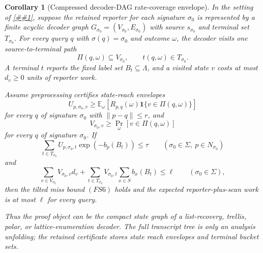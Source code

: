 \documentclass[10pt]{article}
\newcommand{\cref}[1]{\ref{##1}}
\newtheorem{corollary}[theorem]{Corollary}
\theoremstyle{definition}
\newcommand{\E}{\mathbb{E}}
\begin{document}
\begin{corollary}[Compressed decoder-DAG rate-coverage envelope]
   \label{cor:compressed-decoder-dag-rate-coverage}
   In the setting of \cref{lem:finite-signature-rate-coverage}, suppose the
   retained reporter for each signature \(\sigma_0\) is represented by a finite
   acyclic decoder graph \(G_{\sigma_0}=(V_{\sigma_0},E_{\sigma_0})\) with
   source \(s_{\sigma_0}\) and terminal set \(T_{\sigma_0}\).  For every query
   \(q\) with \(\sigma(q)=\sigma_0\) and outcome \(\omega\), the decoder visits
   one source-to-terminal path
   \[
      \Pi(q,\omega)\subseteq V_{\sigma_0},
      \qquad
      t(q,\omega)\in T_{\sigma_0}.
   \]
   A terminal \(t\) reports the fixed label set \(B_t\subseteq\Lambda\), and a
   visited state \(v\) costs at most \(d_v\ge0\) units of reporter work.

   Assume preprocessing certifies state-reach envelopes
   \[
      U_{p,\sigma_0,v}
      \ge
      \E_\omega\!\left[
         R_{p,q}(\omega)\mathbf 1\{v\in\Pi(q,\omega)\}
      \right]
      \tag{DG1}
   \]
   for every \(q\) of signature \(\sigma_0\) with \(\|p-q\|\le r\), and
   \[
      V_{\sigma_0,v}
      \ge
      \Pr_\omega[v\in\Pi(q,\omega)]
      \tag{DG2}
   \]
   for every \(q\) of signature \(\sigma_0\).  If
   \[
      \sum_{t\in T_{\sigma_0}}
      U_{p,\sigma_0,t}\exp(-b_p(B_t))
      \le \tau
      \qquad(\sigma_0\in\Sigma,\ p\in N_{\sigma_0})
      \tag{DG3}
   \]
   and
   \[
      \sum_{v\in V_{\sigma_0}}V_{\sigma_0,v}d_v
      +
      \sum_{t\in T_{\sigma_0}}
      V_{\sigma_0,t}\sum_{x\in S}b_x(B_t)
      \le \ell
      \qquad(\sigma_0\in\Sigma),
      \tag{DG4}
   \]
   then the tilted miss bound \((FS6)\) holds and the expected
   reporter-plus-scan work is at most \(\ell\) for every query.

   Thus the proof object can be the compact state graph of a list-recovery,
   trellis, polar, or lattice-enumeration decoder.  The full transcript tree is
   only an analysis unfolding; the retained certificate stores state reach
   envelopes and terminal bucket sets.
\end{corollary}
\end{document}
